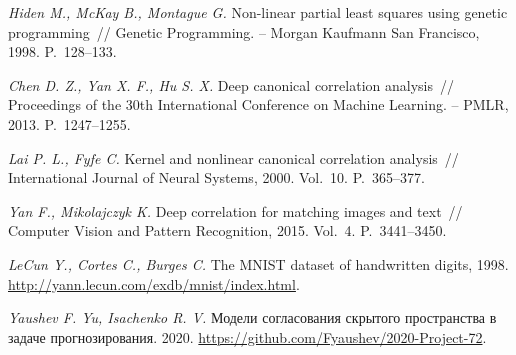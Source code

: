 \documentclass[12pt]{article}
\begin{document}
\begin{thebibliography}{99}
\textit{Hiden M., McKay B., Montague G.} Non-linear partial least squares using genetic programming~// Genetic Programming. -- Morgan Kaufmann San Francisco, 1998. P.~128--133.

\textit{Chen D. Z., Yan X. F., Hu S. X.} Deep canonical correlation analysis~// Proceedings of the 30th International Conference on Machine Learning. -- PMLR, 2013. P.~1247--1255.

\textit{Lai P. L., Fyfe C.} Kernel and nonlinear canonical correlation analysis~// International Journal of Neural Systems, 2000. Vol.~10. P.~365--377.

\textit{Yan F., Mikolajczyk K.} Deep correlation for matching images and text~// Computer Vision and Pattern Recognition, 2015. Vol.~4. P.~3441--3450.

\textit{LeCun Y.,  Cortes C., Burges C.} The MNIST dataset of handwritten digits, 1998. \url{http://yann.lecun.com/exdb/mnist/index.html}.

\textit{Yaushev F. Yu,  Isachenko R. V.} Модели согласования скрытого пространства в задаче прогнозирования. 2020. \url{https://github.com/Fyaushev/2020-Project-72}.
\end{thebibliography}
\end{document}
